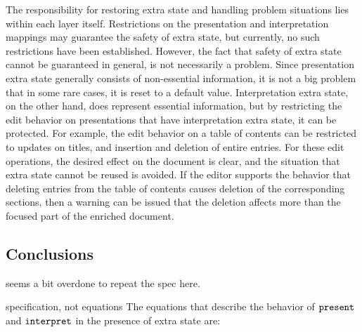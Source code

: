 The responsibility for restoring extra state and handling problem situations lies within each layer itself. Restrictions on the presentation and interpretation mappings may guarantee the safety of extra state, but currently, no such restrictions have been established. However, the fact that safety of extra state cannot be guaranteed in general, is not necessarily a problem. Since presentation extra state generally consists of non-essential information, it is not a big problem that in some rare cases, it is reset to a default value.  Interpretation extra state, on the other hand, does represent essential information, but by restricting the edit behavior on presentations that have interpretation extra state, it can be protected. For example, the edit behavior on a table of contents can be restricted to updates on titles, and insertion and deletion of entire entries. For these edit operations, the desired effect on the document is clear, and the situation that extra state cannot be reused is avoided. If the editor supports the behavior that deleting entries from the table of contents causes deletion of the corresponding sections, then a warning can be issued that the deletion affects more than the focused part of the enriched document. 





%																
\subsection{Conclusions}

\bc seems a bit overdone to repeat the spec here.

specification, not equations
The equations that describe the behavior of ${\tt present}$ and ${\tt interpret}$ in the presence of extra state are:

